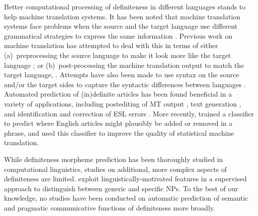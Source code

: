 \documentclass[11pt,letterpaper]{article}
\newcommand{\ensuretext}[1]{#1}
\newcommand{\nssmarker}{\ensuretext{\textcolor{magenta}{\ensuremath{^{\textsc{NS}}_{\textsc{S}}}}}}
\newcommand{\ytmarker}{\ensuretext{\textcolor{blue}{\ensuremath{^{\textsc{Y}}_{\textsc{T}}}}}}
\newcommand{\arkcomment}[3]{\ensuretext{\textcolor{#3}{[#1 #2]}}}
\newcommand{\nss}[1]{\arkcomment{\nssmarker}{#1}{magenta}}
\newcommand{\yt}[1]{\arkcomment{\ytmarker}{#1}{blue}}
\newcommand{\finalversion}[1]{}
\begin{document}
Better computational processing of definiteness in different languages stands to help machine translation systems. 
It has been noted that machine translation systems face problems when the source and the target language 
use different grammatical strategies to express the same information \citep{stymne09,tsvetkov13}. 
Previous work on machine translation has attempted to deal with this in terms of either 
(a)~preprocessing the source language to make it look more like the target language \citep[\textit{inter alia}]{collins05,habash07,niessen00,stymne09}; 
or (b)~post-processing the machine translation output to match the target language, \cite[e.g.,][]{popovic06}. 
Attempts have also been made to use syntax on the source and\slash or the target sides 
to capture the syntactic differences between languages \citep{liu06,yamada02,zhang07}. 
Automated prediction of (in)definite articles has been found beneficial in a variety of applications, 
including postediting of MT output \citep{knight1994automated}, text generation \citep{DBLP:conf/aaai/Elhadad93,minnen2000memory}, 
and identification and correction of ESL errors \citep{aehan2006detecting,de2008classifier,gamon2008,rozovskaya2010training}. 
More recently, \citet{tsvetkov13} trained a classifier to predict where English articles might plausibly be added or removed in a phrase, 
and used this classifier to improve the quality of statistical machine translation. 

While definiteness morpheme prediction has been thoroughly studied in computational linguistics, 
studies on additional, more complex aspects of definiteness are limited.  
\citet{reiter10}  exploit linguistically-motivated features in a supervised approach to 
distinguish between generic and specific NPs.\finalversion{\yt{what else?}}
To the best of our knowledge, no studies have been conducted 
on automatic prediction of semantic and pragmatic communicative functions of definiteness more broadly. 

\end{document}
